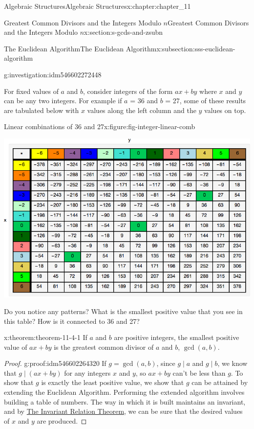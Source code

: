 \documentclass[oneside,10pt,]{book}
\numberwithin{equation}{section}
\begin{document}
\begin{chapterptx}{Algebraic Structures}{}{Algebraic Structures}{}{}{x:chapter:chapter_11}
\begin{sectionptx}{Greatest Common Divisors  and the Integers Modulo \(n\)}{}{Greatest Common Divisors  and the Integers Modulo \(n\)}{}{}{x:section:s-gcds-and-zsubn}
\begin{subsectionptx}{The Euclidean Algorithm}{}{The Euclidean Algorithm}{}{}{x:subsection:sss-euclidean-algorithm}
\begin{investigation}{}{g:investigation:idm546602272448}
\end{investigation}
For fixed values of \(a\) and \(b\), consider integers of the form \(a x+b y\) where \(x\) and \(y\) can be any two integers.  For example if \(a\) = 36 and \(b\) = 27,  some of these results are tabulated below with \(x\) values along the left column and the \(y\) values on top.%
\begin{figureptx}{Linear combinations of 36 and 27}{x:figure:fig-integer-linear-comb}{}%
\begin{image}{0.125}{0.75}{0.125}%
\includegraphics[width=\linewidth]{images/fig-integer-linear-comb.png}
\end{image}%
\tcblower
\end{figureptx}%
Do you notice any patterns?   What is the smallest positive value that you see in this table?  How is it connected to 36 and 27?%
\begin{theorem}{}{}{x:theorem:theorem-11-4-1}%
If \(a\) and \(b\) are positive integers, the smallest positive value of \(a x + b y\) is the greatest common divisor of \(a\) and \(b\), \(\gcd(a,b)\).%
\end{theorem}
\begin{proof}{}{g:proof:idm546602264320}
If  \(g = \gcd(a, b)\), since \(g \mid a\) and  \(g \mid b\), we know that  \(g \mid (a x + b y)\) for any integers \(x\) and \(y\), so \(a x + b y\) can't be less than \(g\).  To show that \(g\) is exactly the least positive value, we show that \(g\) can be attained by extending the Euclidean Algorithm.  Performing the extended algorithm involves building a table of numbers.  The way in which it is built  maintains an invariant, and by \hyperref[x:theorem:th-invariant-relation-theorem]{The Invariant Relation Theorem}, we can be sure that the desired values of \(x\) and \(y\) are produced.%

\end{proof}
\end{subsectionptx}
\end{sectionptx}
\end{chapterptx}
\end{document}
